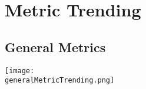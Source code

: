 %
% 
% 
%
%
\section{Metric Trending}

\subsection{General Metrics}

\begin{center}
\texttt{[image: \\generalMetricTrending.png]}
\end{center}


